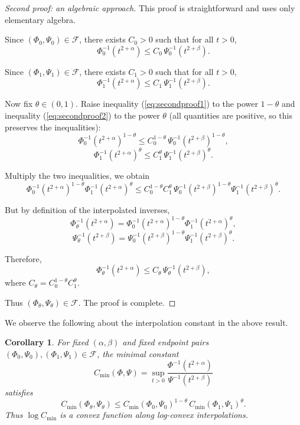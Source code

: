 \documentclass[12pt]{amsart}
\newtheorem{corollary}{Corollary}
\begin{document}
\begin{proof}[Second proof: an algebraic approach]
This proof is straightforward and uses only elementary algebra.

Since $(\Phi_0,\Psi_0) \in \mathcal{F}$, there exists $C_0 > 0$ such that for all $t > 0$,
\begin{equation}\label{eq:secondproof1}
\Phi_0^{-1}\!\left( t^{2+\alpha} \right) \le C_0 \, \Psi_0^{-1}\!\left( t^{2+\beta} \right).
\end{equation}

Since $(\Phi_1,\Psi_1) \in \mathcal{F}$, there exists $C_1 > 0$ such that for all $t > 0$,
\begin{equation}\label{eq:secondproof2}
\Phi_1^{-1}\!\left( t^{2+\alpha} \right) \le C_1 \, \Psi_1^{-1}\!\left( t^{2+\beta} \right). 
\end{equation}

Now fix $\theta \in (0,1)$. Raise inequality (\ref{eq:secondproof1}) to the power $1-\theta$ and inequality (\ref{eq:secondproof2}) to the power $\theta$ (all quantities are positive, so this preserves the inequalities):
\[
\Phi_0^{-1}\!\left( t^{2+\alpha} \right)^{1-\theta} \le C_0^{1-\theta} \, \Psi_0^{-1}\!\left( t^{2+\beta} \right)^{1-\theta},
\]
\[
\Phi_1^{-1}\!\left( t^{2+\alpha} \right)^{\theta} \le C_1^{\theta} \, \Psi_1^{-1}\!\left( t^{2+\beta} \right)^{\theta}.
\]

Multiply the two inequalities, we obtain
\[
\Phi_0^{-1}\!\left( t^{2+\alpha} \right)^{1-\theta} \Phi_1^{-1}\!\left( t^{2+\alpha} \right)^{\theta}
\le C_0^{1-\theta} C_1^{\theta} \,
\Psi_0^{-1}\!\left( t^{2+\beta} \right)^{1-\theta} \Psi_1^{-1}\!\left( t^{2+\beta} \right)^{\theta}.
\]

But by definition of the interpolated inverses,
\[
\Phi_\theta^{-1}\!\left( t^{2+\alpha} \right) = \Phi_0^{-1}\!\left( t^{2+\alpha} \right)^{1-\theta} \Phi_1^{-1}\!\left( t^{2+\alpha} \right)^{\theta},
\]
\[
\Psi_\theta^{-1}\!\left( t^{2+\beta} \right) = \Psi_0^{-1}\!\left( t^{2+\beta} \right)^{1-\theta} \Psi_1^{-1}\!\left( t^{2+\beta} \right)^{\theta}.
\]

Therefore,
\[
\Phi_\theta^{-1}\!\left( t^{2+\alpha} \right) \le C_\theta \, \Psi_\theta^{-1}\!\left( t^{2+\beta} \right),
\]
where $C_\theta = C_0^{1-\theta} C_1^{\theta}$.

Thus $(\Phi_\theta,\Psi_\theta) \in \mathcal{F}$. The proof is complete.
\end{proof}

We observe the following about the interpolation constant in the above result.
\begin{corollary}
For fixed $(\alpha,\beta)$ and fixed endpoint pairs $(\Phi_0,\Psi_0), (\Phi_1,\Psi_1) \in \mathcal{F}$,
the minimal constant
\[
C_{\min}(\Phi,\Psi) = \sup_{t>0} \frac{\Phi^{-1}(t^{2+\alpha})}{\Psi^{-1}(t^{2+\beta})}
\]
satisfies
\[
C_{\min}(\Phi_\theta,\Psi_\theta) \le C_{\min}(\Phi_0,\Psi_0)^{1-\theta} \,
C_{\min}(\Phi_1,\Psi_1)^{\theta}.
\]
Thus $\log C_{\min}$ is a convex function along log-convex interpolations.
\end{corollary}
\end{document}
